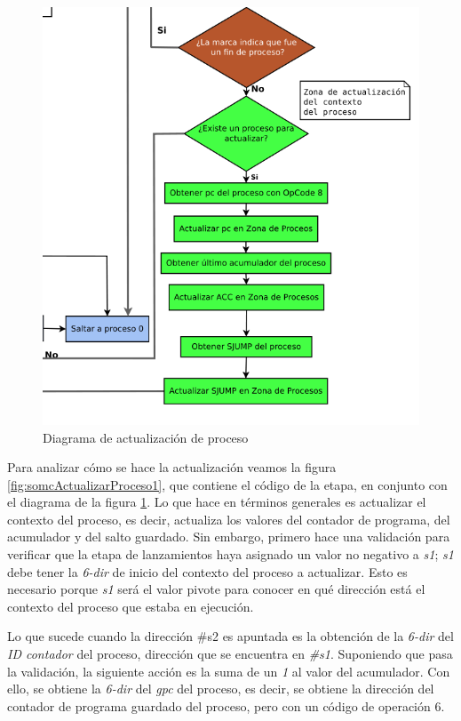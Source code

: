 \documentclass[letterpaper,12pt,oneside]{book}
\begin{document}
		\begin{figure}[ht]		
			\centering
			\includegraphics[scale=0.6]{media/CARDIACC/DiagActualizacionProcess.png}
			\caption{ Diagrama de actualización de proceso}
			\label{fig:diagActualProccess1}
		\end{figure}		
		
		Para analizar cómo se hace la actualización veamos la figura  \ref{fig:somcActualizarProceso1},	que contiene el código de la etapa,
		en conjunto con el diagrama de la figura \ref{fig:diagActualProccess1}. Lo
		que hace en términos generales es actualizar el contexto del proceso, es decir, actualiza los valores del contador de programa, 
		del acumulador y del
		salto guardado. Sin embargo, primero hace una validación para verificar que la etapa de lanzamientos haya 
		asignado un valor no negativo a \textit{s1}; \textit{s1} debe tener 
		la \textit{6-dir} de  inicio del contexto del proceso a actualizar. Esto es necesario porque \textit{s1}
		será el valor pivote para conocer en qué dirección está el contexto del proceso que estaba en ejecución.
  
        Lo que sucede cuando la dirección \#s2 es apuntada es la obtención de
		la \textit{6-dir} del \textit{ID contador} del proceso, dirección que se encuentra en \textit{\#s1}. Suponiendo que pasa la validación, 
		la siguiente acción es la
		suma de un \textit{1} al valor del acumulador. Con ello,
		se obtiene la \textit{6-dir} del \textit{gpc} del proceso, es decir, se obtiene la dirección del contador de programa guardado del proceso,
		pero con un código de operación 6.
  
\end{document}

